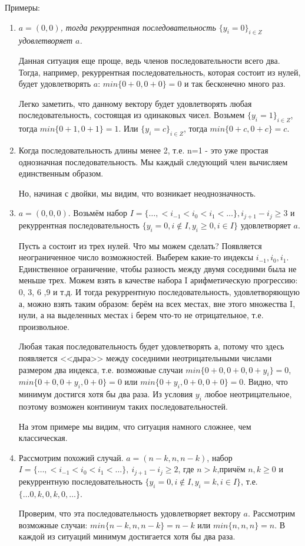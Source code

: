\documentclass[russian]{lecture-notes}
\begin{document}
 Примеры:
\begin{enumerate}
 \item
\slshape$a=(0,0)$, тогда рекуррентная последовательность $\{y_i=0\} _{i\in Z}$ удовлетворяет $a$.\upshape

Данная ситуация еще проще, ведь членов последовательности всего два. Тогда, например, рекуррентная последовательность, которая состоит из нулей, будет удовлетворять $a$: $min\{0+0,0+0\}=0$ и так бесконечно много раз.\

Легко заметить, что данному вектору будет удовлетворять любая последовательность, состоящая из одинаковых чисел.
Возьмем $\{y_i=1\} _{i\in Z}$, тогда $min\{0+1,0+1\}=1$. Или $\{y_i=c\} _{i\in Z}$,
тогда $min\{0+c,0+c\}=c$.

\item
Когда последовательность
длины менее 2, т.е. n=1 - это уже простая однозначная последовательность. Мы каждый следующий член
вычисляем единственным образом.

Но, начиная с двойки, мы видим, что
возникает неоднозначность.

\item

$a=(0,0,0).$ Возьмём набор $I=\{\ldots ,<i_{-1}<i_0<i_1<\ldots \}, i_{j+1}-i_j\geq 3$ и рекуррентная последовательность $\{y_i=0, i\notin I, y_i\geq 0, i\in I\}$ удовлетворяет $a$.


Пусть а состоит из трех нулей. Что мы можем сделать? Появляется неограниченное число возможностей. Выберем какие-то  индексы $i_{-1},i_0,i_1$. Единственное ограничение, чтобы разность
между двумя соседними была не меньше трех. Можем взять в качестве набора I арифметическую прогрессию: 0, 3, 6 ,9 и т.д. И тогда рекуррентную последовательность, удовлетворяющую а, можно взять таким образом: берём на всех местах, вне этого множества I, нули, а на выделенных  местах i берем что-то не отрицательное, т.е. произвольное.

Любая такая последовательность будет удовлетворять а, потому что здесь появляется <<дыра>> между соседними неотрицательными
числами размером два индекса, т.е. возможные случаи $min\{0+0,0+0,0+y_i\}=0$, $min\{0+0,0+y_i,0+0\}=0$ или $min\{0+y_i,0+0,0+0\}=0$. Видно, что минимум достигся хотя бы два раза.
Из условия $y_i$ любое неотрицательное, поэтому возможен континиум таких последовательностей.

На этом примере мы видим, что ситуация намного сложнее,
чем классическая.

\item
 Рассмотрим похожий случай. $a=(n-k,n,n-k)$, набор $I=\{\ldots ,<i_{-1}<i_0<i_1<\ldots \},\ i_{j+1}-i_j\geq 2$, где $n>k$,причём $n,k\geq 0$ и рекуррентную последовательность $\{y_i=0, i\notin I, y_i=k, i\in I\}$, т.е. $\{\ldots 0,k,0,k,0,\ldots\}$.


Проверим,  что эта последовательность удовлетворяет вектору $a$. Рассмотрим возможные случаи: $min\{n-k,n,n-k\}=n-k$ или $min\{n,n,n\}=n$. В каждой из ситуаций минимум достигается хотя бы два раза.

\end{enumerate}
\end{document}
